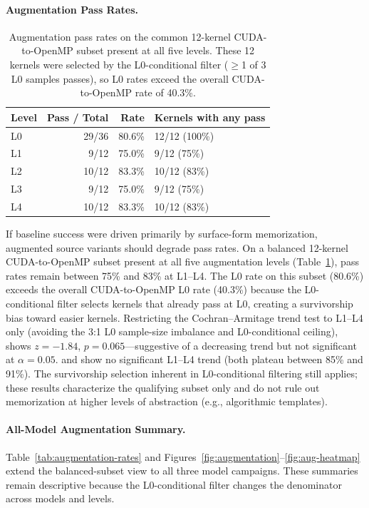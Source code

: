 \paragraph{Augmentation Pass Rates.}
\begin{table}[h]
\centering
\caption{Augmentation pass rates on the common 12-kernel CUDA-to-OpenMP subset present at all five levels. These 12 kernels were selected by the L0-conditional filter ($\geq$1 of 3 L0 samples passes), so L0 rates exceed the overall CUDA-to-OpenMP rate of 40.3\%.}
\label{tab:aug-balanced}
\small
\begin{tabular}{@{}lrrl@{}}
\toprule
Level & Pass / Total & Rate & Kernels with any pass \\
\midrule
L0 & 29/36 & 80.6\% & 12/12 (100\%) \\
L1 &  9/12 & 75.0\% &  9/12 \phantom{0}(75\%) \\
L2 & 10/12 & 83.3\% & 10/12 \phantom{0}(83\%) \\
L3 &  9/12 & 75.0\% &  9/12 \phantom{0}(75\%) \\
L4 & 10/12 & 83.3\% & 10/12 \phantom{0}(83\%) \\
\bottomrule
\end{tabular}
\end{table}

If baseline success were driven primarily by surface-form memorization, augmented source variants should degrade pass rates. On a balanced 12-kernel CUDA-to-OpenMP subset present at all five augmentation levels (Table~\ref{tab:aug-balanced}), pass rates remain between 75\% and 83\% at L1--L4. The L0 rate on this subset (80.6\%) exceeds the overall CUDA-to-OpenMP L0 rate (40.3\%) because the L0-conditional filter selects kernels that already pass at L0, creating a survivorship bias toward easier kernels. Restricting the Cochran--Armitage trend test to L1--L4 only (avoiding the 3:1 L0 sample-size imbalance and L0-conditional ceiling), \qwenshort{} shows $z = -1.84$, $p = 0.065$---suggestive of a decreasing trend but not significant at $\alpha = 0.05$. \gptnew{} and \codex{} show no significant L1--L4 trend (both plateau between 85\% and 91\%). The survivorship selection inherent in L0-conditional filtering still applies; these results characterize the qualifying subset only and do not rule out memorization at higher levels of abstraction (e.g., algorithmic templates).

\paragraph{All-Model Augmentation Summary.}
Table~\ref{tab:augmentation-rates} and Figures~\ref{fig:augmentation}--\ref{fig:aug-heatmap}
extend the balanced-subset view to all three model campaigns. These summaries
remain descriptive because the L0-conditional filter changes the denominator
across models and levels.

